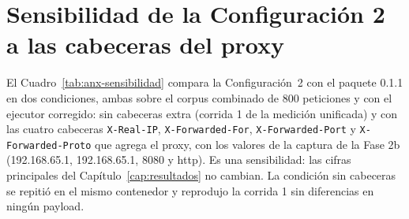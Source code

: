 \section{Sensibilidad de la Configuración 2 a las cabeceras del proxy}
\label{anx:sensibilidad}

El Cuadro~\ref{tab:anx-sensibilidad} compara la Configuración~2 con el paquete 0.1.1 en dos
condiciones, ambas sobre el corpus combinado de 800 peticiones y con el ejecutor corregido: sin
cabeceras extra (corrida 1 de la medición unificada) y con las cuatro cabeceras
\texttt{X-Real-IP}, \texttt{X-Forwarded-For}, \texttt{X-Forwarded-Port} y
\texttt{X-Forwarded-Proto} que agrega el proxy, con los valores de la captura de la Fase 2b
(192.168.65.1, 192.168.65.1, 8080 y http). Es una sensibilidad: las cifras principales del
Capítulo~\ref{cap:resultados} no cambian. La condición sin cabeceras se repitió en el mismo
contenedor y reprodujo la corrida 1 sin diferencias en ningún payload.

